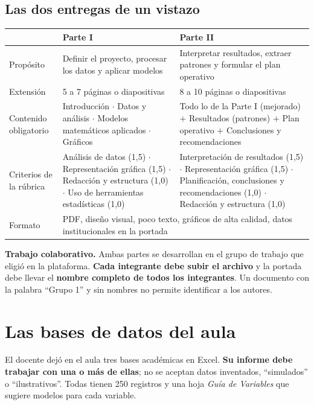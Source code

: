 \subsection{Las dos entregas de un vistazo}

\begin{center}
\footnotesize
\begin{tabularx}{\textwidth}{@{}p{3.1cm}XX@{}}
\toprule
& \textbf{Parte I} & \textbf{Parte II}\\
\midrule
Propósito & Definir el proyecto, procesar los datos y aplicar modelos & Interpretar resultados, extraer patrones y formular el plan operativo\\[3pt]
Extensión & 5 a 7 páginas o diapositivas & 8 a 10 páginas o diapositivas\\[3pt]
Contenido obligatorio & Introducción $\cdot$ Datos y análisis $\cdot$ Modelos matemáticos aplicados $\cdot$ Gráficos & Todo lo de la Parte I (mejorado) $+$ Resultados (patrones) $+$ Plan operativo $+$ Conclusiones y recomendaciones\\[3pt]
Criterios de la rúbrica & Análisis de datos (1,5) $\cdot$ Representación gráfica (1,5) $\cdot$ Redacción y estructura (1,0) $\cdot$ Uso de herramientas estadísticas (1,0) & Interpretación de resultados (1,5) $\cdot$ Representación gráfica (1,5) $\cdot$ Planificación, conclusiones y recomendaciones (1,0) $\cdot$ Redacción y estructura (1,0)\\[3pt]
Formato & \multicolumn{2}{l}{PDF, diseño visual, poco texto, gráficos de alta calidad, datos institucionales en la portada}\\
\bottomrule
\end{tabularx}
\end{center}

\begin{cajaAlerta}
\textbf{Trabajo colaborativo.} Ambas partes se desarrollan en el grupo de trabajo que
eligió en la plataforma. \textbf{Cada integrante debe subir el archivo} y la portada debe
llevar el \textbf{nombre completo de todos los integrantes}. Un documento con la palabra
``Grupo 1'' y sin nombres no permite identificar a los autores.
\end{cajaAlerta}

\section{Las bases de datos del aula}

El docente dejó en el aula tres bases académicas en Excel. \textbf{Su informe debe
trabajar con una o más de ellas}; no se aceptan datos inventados, ``simulados'' o
``ilustrativos''. Todas tienen 250 registros y una hoja \textit{Guía de Variables} que
sugiere modelos para cada variable.


